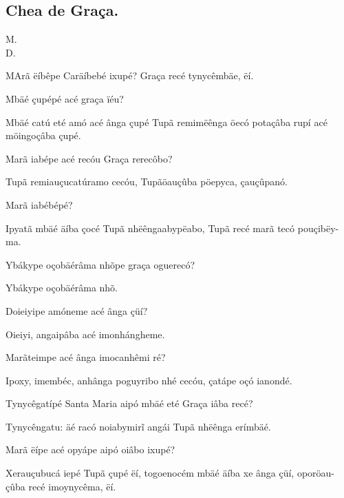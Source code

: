 \documentclass[openany,titlepage,12pt]{book}
\newcommand{\comecalista}[5]{
    \hspace*{-11.7pt}
    \begin{minipage}[t]{0.08\linewidth}
        \flushright #1\\#2
    \end{minipage}
    \hspace{0pt}
    \begin{minipage}[t]{0.94\linewidth}
        \lettrine
        [findent =2pt, nindent=0pt,  lines=2]
        {#3}{#4}#5
    \end{minipage}
    \vspace*{-3pt}
}
\begin{document}
\subsection{Chea de Graça.}
\vspace*{2pt}
\comecalista{M.}{D.}{M}{A}
    {rã ëíbêpe Caräíbebé ixupé?
     Graça recé tynycêmbäe, ëí.}
\begin{alternate}
    \item Mbäé çupépé acé graça ïéu?
    \item Mbäé catú eté amó acé ânga çupé Tupã
    remimëênga öecó potaçâba rupí acé möingoçâba çupé.
    \item Marã iabépe acé recóu Graça rerecôbo?
    \item Tupã remiauçucatúramo cecóu, Tupã\linebreak öauçûba
    pöepyca, çauçûpanó.
    \item Marã iabébépé?
    \item Ipyatã mbäé äíba çocé Tupã nhëênga\linebreak abypëabo,
    Tupã recé marã tecó pouçibëy-ma.
    \item Ybákype oçobäérâma nhõpe graça oguerecó?
    \item Ybákype oçobäérâma nhõ.
    \item Doieiyipe amóneme acé ânga çüí?
    \item Oieiyi, angaipâba acé imonhángheme.
    \item Marãteimpe acé ânga imocanhêmi ré?
    \item Ipoxy, imembéc, anhânga poguyribo nhé
    cecóu, çatápe oçó ianondé.
    \item Tynycêgatípé Santa Maria aipó mbäé eté Graça iâba recé?
    \item Tynycêngatu: äé racó noiabymirĩ angái Tupã nhëênga
    erímbäé.
    \item Marã ëípe acé opyápe aipó oiâbo ixupé?
    \item Xerauçubucá iepé Tupã çupé ëí, togoenocém mbäé
    äíba xe ânga çüí, oporöau-çûba recé imoynycêma, ëí. 
\end{alternate}
\end{document}
